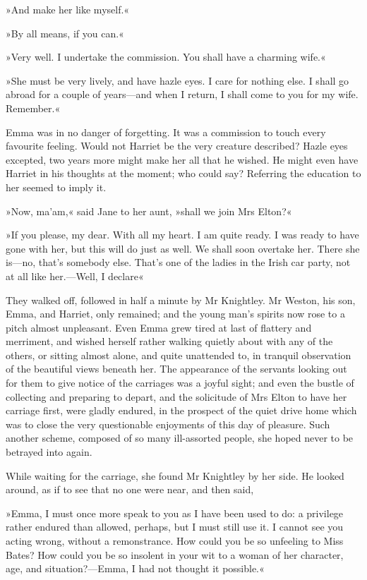 »And make her like myself.«

»By all means, if you can.«

»Very well. I undertake the commission. You shall have a charming wife.«

»She must be very lively, and have hazle eyes. I care for nothing else. I shall go abroad for a couple of years—and when I return, I shall come to you for my wife. Remember.«

Emma was in no danger of forgetting. It was a commission to touch every favourite feeling. Would not Harriet be the very creature described? Hazle eyes excepted, two years more might make her all that he wished. He might even have Harriet in his thoughts at the moment; who could say? Referring the education to her seemed to imply it.

»Now, ma'am,« said Jane to her aunt, »shall we join Mrs Elton?«

»If you please, my dear. With all my heart. I am quite ready. I was ready to have gone with her, but this will do just as well. We shall soon overtake her. There she is—no, that's somebody else. That's one of the ladies in the Irish car party, not at all like her.—Well, I declare\longdash«

They walked off, followed in half a minute by Mr Knightley. Mr Weston, his son, Emma, and Harriet, only remained; and the young man's spirits now rose to a pitch almost unpleasant. Even Emma grew tired at last of flattery and merriment, and wished herself rather walking quietly about with any of the others, or sitting almost alone, and quite unattended to, in tranquil observation of the beautiful views beneath her. The appearance of the servants looking out for them to give notice of the carriages was a joyful sight; and even the bustle of collecting and preparing to depart, and the solicitude of Mrs Elton to have her carriage first, were gladly endured, in the prospect of the quiet drive home which was to close the very questionable enjoyments of this day of pleasure. Such another scheme, composed of so many ill-assorted people, she hoped never to be betrayed into again.

While waiting for the carriage, she found Mr Knightley by her side. He looked around, as if to see that no one were near, and then said,

»Emma, I must once more speak to you as I have been used to do: a privilege rather endured than allowed, perhaps, but I must still use it. I cannot see you acting wrong, without a remonstrance. How could you be so unfeeling to Miss Bates? How could you be so insolent in your wit to a woman of her character, age, and situation?—Emma, I had not thought it possible.«

